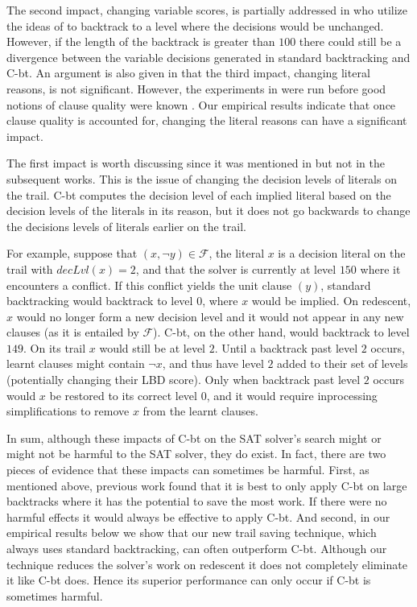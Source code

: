 \documentclass[runningheads]{llncs}
\newcommand{\sat}{SAT\xspace}
\newcommand{\dlevel}[1]{\ensuremath{\mathit{decLvl}(#1)}}
\newcommand{\formula}{\ensuremath{\mathcal{F}}}
\newcommand{\cbt}{C-bt\xspace}
\begin{document}
The second impact, changing variable scores, is partially addressed in
\cite{DBLP:conf/sat/MohleB19} who utilize the ideas of
\cite{DBLP:journals/jsat/TakRH11} to backtrack to a level where the
decisions would be unchanged. However, if the length of the backtrack
is greater than $100$ there could still be a divergence between the
variable decisions generated in standard backtracking and \cbt. An
argument is also given in \cite{DBLP:journals/jsat/TakRH11} that the
third impact, changing literal reasons, is not significant. However,
the experiments in \cite{DBLP:journals/jsat/TakRH11} were run before
good notions of clause quality were known
\cite{DBLP:conf/ijcai/AudemardS09}. Our empirical results indicate
that once clause quality is accounted for, changing the literal
reasons can have a significant impact.

The first impact is worth discussing since it was mentioned in
\cite{DBLP:conf/lpar/JiangZ13} but not in the subsequent works. This
is the issue of changing the decision levels of literals on the
trail. \cbt computes the decision level of each implied literal based
on the decision levels of the literals in its reason, but it does not
go backwards to change the decisions levels of literals earlier on the
trail.

\begin{example}
    For example, suppose that $(x, \lnot y)\in \formula$, the literal $x$
    is a decision literal on the trail with $\dlevel{x}=2$, and that
    the solver is currently at level $150$ where it encounters a
    conflict. If this conflict yields the unit clause $(y)$, standard
    backtracking would backtrack to level $0$, where $x$ would be
    implied. On redescent, $x$ would no longer form a new decision
    level and it would not appear in any new clauses (as it is
    entailed by $\formula$). \cbt, on the other hand, would backtrack
    to level $149$. On its trail $x$ would still be at level
    $2$. Until a backtrack past level $2$ occurs, learnt clauses might
    contain $\lnot x$, and thus have level $2$ added to their set of
    levels (potentially changing their LBD score). Only when backtrack
    past level $2$ occurs would $x$ be restored to its correct level
    $0$, and it would require inprocessing simplifications to remove $x$
    from the learnt clauses.
\end{example}

In sum, although these impacts of \cbt on the \sat solver's search
might or might not be harmful to the \sat solver, they do exist. In
fact, there are two pieces of evidence that these impacts can
sometimes be harmful. First, as mentioned above, previous work found
that it is best to only apply \cbt on large backtracks where it has
the potential to save the most work. If there were no harmful effects
it would always be effective to apply \cbt. And second, in our
empirical results below we show that our new trail saving technique,
which always uses standard backtracking, can often outperform
\cbt. Although our technique reduces the solver's work on redescent it
does not completely eliminate it like \cbt does. Hence its superior
performance can only occur if \cbt is sometimes harmful.
\end{document}
